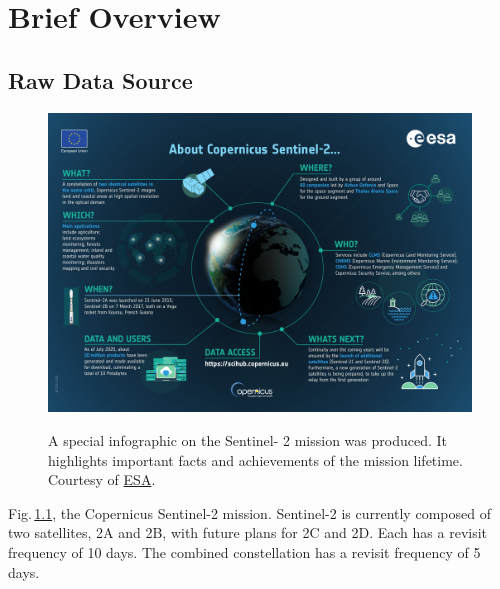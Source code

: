\chapter{Brief Overview}
\section{Raw Data Source}

\begin{figure}[ht]
    \centering
    \href{https://sentinels.copernicus.eu/documents/247904/4180891/Sentinel-2-infographic.pdf}{\includegraphics[width=0.9\linewidth]{figures_misc/Sentinel-2-infographic.pdf}}
    \caption{A special infographic on the Sentinel- 2 mission was produced. It highlights important facts and achievements of the mission lifetime. Courtesy of \href{https://sentinels.copernicus.eu/web/sentinel/missions/sentinel-2}{ESA}.}
    \label{fig:sentinel2_info}
\end{figure}

Fig.\,\ref{fig:sentinel2_info}, the Copernicus Sentinel-2 mission.
Sentinel-2 is currently composed of two satellites, 2A and 2B, with future plans for 2C and 2D.
Each has a revisit frequency of 10 days.
The combined constellation has a revisit frequency of 5 days. 

